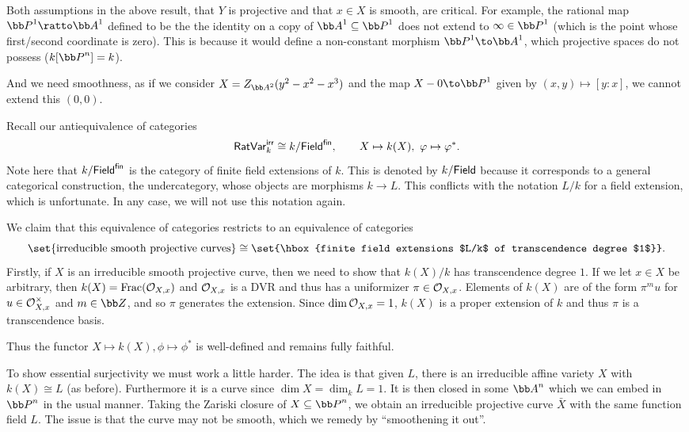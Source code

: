 \eproof

\bnote

    Both assumptions in the above result, that $Y$ is projective and that $x\in X$ is smooth, are critical.
    For example, the rational map $\bP^1\ratto\bA^1$ defined to be the the identity on a copy of $\bA^1\subseteq\bP^1$ does not extend to $\infty\in\bP^1$ (which is the point whose first/second coordinate is zero).
    This is because it would define a non-constant morphism $\bP^1\to\bA^1$, which projective spaces do not possess ($k[\bP^n]=k$).

    And we need smoothness, as if we consider $X=Z_{\bA^2}(y^2-x^2-x^3)$ and the map $X-0\to\bP^1$ given by $(x,y)\mapsto[y:x]$, we cannot extend this $(0,0)$.

\enote

Recall our antiequivalence of categories
$$ {\sf RatVar}^{\sf irr}_k\cong k/{\sf Field}^{\sf fin},\qquad X\mapsto k(X),\ \varphi\mapsto\varphi^* . $$
Note here that $k/{\sf Field}^{\sf fin}$ is the category of finite field extensions of $k$.
This is denoted by $k/{\sf Field}$ because it corresponds to a general categorical construction, the undercategory, whose objects are morphisms $k\to L$.
This conflicts with the notation $L/k$ for a field extension, which is unfortunate.
In any case, we will not use this notation again.

We claim that this equivalence of categories restricts to an equivalence of categories
$$ \set{\hbox{irreducible smooth projective curves}} \cong \set{\hbox{finite field extensions $L/k$ of transcendence degree $1$}} . $$
Firstly, if $X$ is an irreducible smooth projective curve, then we need to show that $k(X)/k$ has transcendence degree $1$.
If we let $x\in X$ be arbitrary, then $k(X)={\rm Frac}({{\cal O}}_{X,x})$ and ${{\cal O}}_{X,x}$ is a DVR and thus has a uniformizer $\pi\in{{\cal O}}_{X,x}$.
Elements of $k(X)$ are of the form $\pi^mu$ for $u\in{{\cal O}}_{X,x}^\times$ and $m\in\bZ$, and so $\pi$ generates the extension.
Since $\dim{{\cal O}}_{X,x}=1$, $k(X)$ is a proper extension of $k$ and thus $\pi$ is a transcendence basis.

Thus the functor $X\mapsto k(X),\phi\mapsto\phi^*$ is well-defined and remains fully faithful.

To show essential surjectivity we must work a little harder.
The idea is that given $L$, there is an irreducible affine variety $X$ with $k(X)\cong L$ (as before).
Furthermore it is a curve since $\dim X=\dim_kL=1$.
It is then closed in some $\bA^n$ which we can embed in $\bP^n$ in the usual manner.
Taking the Zariski closure of $X\subseteq\bP^n$, we obtain an irreducible projective curve $\bar X$ with the same function field $L$.
The issue is that the curve may not be smooth, which we remedy by ``smoothening it out''.


